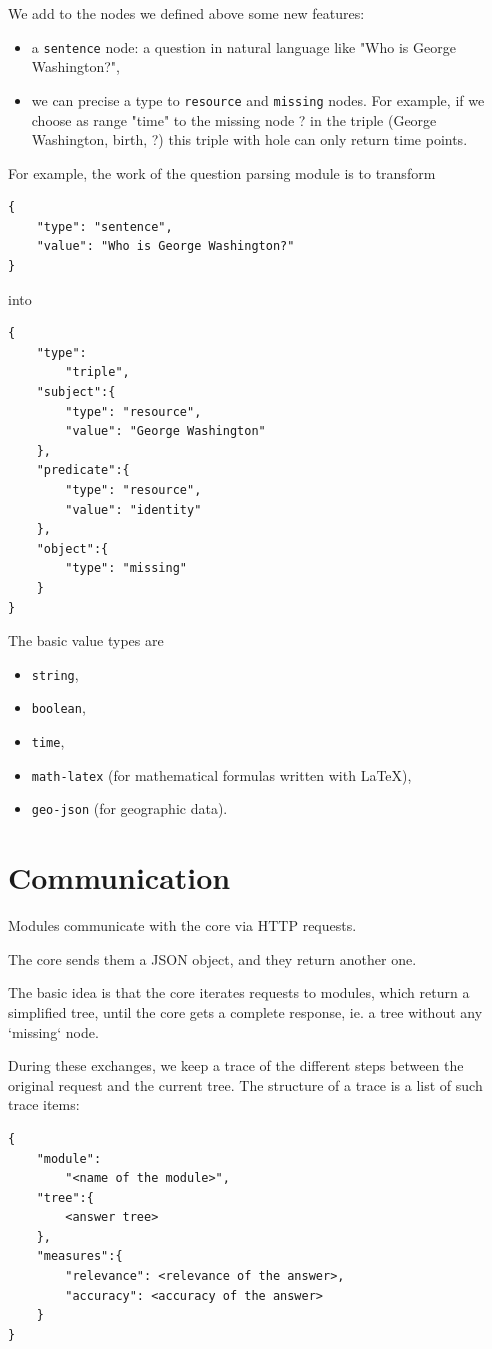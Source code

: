 We add to the nodes we defined above some new features:
\begin{itemize}
    \item a \texttt{sentence} node: a question in natural language like "Who is George Washington?",
    \item we can precise a type to \texttt{resource} and \texttt{missing} nodes. For example, if we choose as range "time" to the missing node ? in the triple (George Washington, birth, ?) this triple with hole can only return time points.
\end{itemize}

For example, the work of the question parsing module is to transform 
\begin{verbatim}
{
    "type": "sentence", 
    "value": "Who is George Washington?"
}
\end{verbatim}
into 
\begin{verbatim}
{
    "type":
        "triple",
    "subject":{
        "type": "resource",
        "value": "George Washington"
    },
    "predicate":{
        "type": "resource",
        "value": "identity"
    },
    "object":{
        "type": "missing"
    }
}
\end{verbatim}

The basic value types are 
\begin{itemize}
    \item \texttt{string},
    \item \texttt{boolean},
    \item \texttt{time},
    \item \texttt{math-latex} (for mathematical formulas written with \LaTeX),
    \item \texttt{geo-json} (for geographic data).
\end{itemize}

\section{Communication}

Modules communicate with the core via HTTP requests.

The core sends them a JSON object, and they return another one.

The basic idea is that the core iterates requests to modules, which return a simplified tree, until the core gets a complete response, ie. a tree without any `missing` node.

During these exchanges, we keep a trace of the different steps between the original request and the current tree. The structure of a trace is a list of such trace items:
\begin{verbatim}
{
    "module":
        "<name of the module>", 
    "tree":{
        <answer tree>
    },
    "measures":{
        "relevance": <relevance of the answer>,
        "accuracy": <accuracy of the answer>
    }
}
\end{verbatim}

